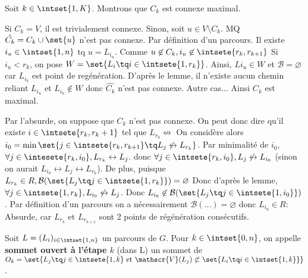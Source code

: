 \documentclass{scrartcl}
\begin{document}
			\begin{demo}
				\item Soit $k \in \intset{1,K}$. Montrons que $C_k$ est connexe maximal.
				\item Si $C_k = V$, il est trivialement connexe. Sinon, soit $u\in V\setminus C_k$. MQ $\hat{C_k} = C_k\cup\set{u}$  n'est pas connexe.
				Par définition d'un parcours. Il existe $i_u \in \intset{1,n}$ tq $u = L_{i_u}$.
				Comme $u \not\in C_k, i_u \not\in \intsete{r_k,r_{k+1}}$
				Si $i_u < r_k$, on pose $W = \set{L_i \tq i \in \intsete{1,r_k}}$. Ainsi, $L{i_u} \in W$ et $\mathcal{B} = \varnothing$ car 
				$L_{i_k}$ est point de regénération. D'après le lemme, il n'existe aucun chemin reliant $L_{i_u}$ et $L_{i_k} \not \in W$
				donc $\hat{C_k}$ n'est pas connexe.
				Autre cas...
				Ainsi $C_k$ est maximal.

				\item Par l'absurde, on suppose que $C_k$ n'est pas connexe.
				On peut donc dire qu'il existe $i \in \intsete{r_k,r_k+1}$ tel que $L_{r_k} \not\leftrightarrow$
				On considère alors $i_0 = \min\set{j \in \intsete{r_k, r_{k+1}} \tq L_j \not\leftrightarrow L_{r_k}}$.
				Par minimalité de $i_0$, $\forall j \in \intesete{r_k,i_0}, L_{r_k} \leftrightarrow L_j$.
				donc $\forall j \in \intsete{r_k,i_0}, L_j \not\leftrightarrow L_{i_0}$ 
				(sinon on aurait $L_{i_0} \leftrightarrow L_j \leftrightarrow L_{r_k}$).
				De plus, puisque $L_{r_k} \in R, \mathcal{B}(\set{L_j \tq j \in \intsete{1,r_k}}) = \varnothing $
				Donc d'après le lemme, $\forall j \in \intsete{1,r_k}, L_{i_0} \not\leftrightarrow L_j$.
				Donc $L_{i_0} \not\in \mathcal{B}(\set{L_j \tq j \in \intsete{1,i_0}})$.
				Par définition d'un parcours on a nécessairement
				$\mathcal{B}(...) = \varnothing$ donc $L_{i_0} \in R$: 
				Absurde, car $L_{r_k}$ et $L_{r_{k+1}}$ sont 2 points de régénération consécutifs.
			\end{demo}

			 Soit $L = (L_i)_{i \in \intset{1,n}}$ un parcours de $G$.
			Pour $k \in \intset{0,n}$, on appelle \textbf{sommet ouvert à l'étape $k$} (dans L)
			un sommet de $O_k = \set{L_j \tq j \in \intsete{1,k} \text{ et } \mathscr{V}(L_j) \not\subset \set{L_i \tq i \in \intset{1,k}}}$.
\end{document}
